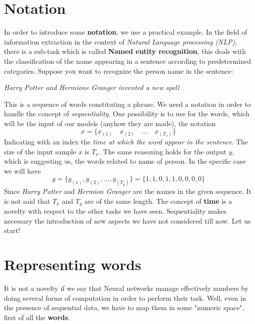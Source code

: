 \section{Notation}
In order to introduce some \textbf{notation}, we use a practical example. In the field of information extraction in the context of \textit{Natural Language processing (NLP)}, there is a sub-task which is called \textbf{Named entity recognition}, this deals with the classification of the name appearing in a sentence according to predetermined categories.
Suppose you want to recognize the person name in the sentence:
\begin{center}
    \textit{Harry Potter and Hermione Granger invented a new spell}
\end{center}
This is a sequence of words constituting a phrase. We need a notation in order to handle the concept of \textit{sequentiality}. One possibility is to use for the words, which will be the input of our models (anyhow they are made), the notation
\begin{equation*}
    x=\{x_{(1)}\quad x_{(2)} \quad ... \quad x_{(T_x)}\}
\end{equation*}  
Indicating with an index the \textit{time at which the word appear in the sentence}. The size of the input sample $x$ is $T_x$. The same reasoning holds for the output $y$, which is suggesting us, the words related to name of person. In the specific case we will have
\begin{equation*}
    y=\{y_{(1)}, y_{(2)}, \dots, y_{(T_y)}\} = \{1,1,0,1,1,0,0,0,0\}
\end{equation*}
Since \textit{Harry Potter} and \textit{Hermion Granger} are the names in the given sequence. It is not said that $T_x$ and $T_y$ are of the same length. The concept of \textbf{time} is a novelty with respect to the other tasks we have seen. Sequentiality makes necessary the introduction of new aspects we have not considered till now. Let us start!

\section{Representing words}
It is not a novelty if we say that Neural networks manage effectively numbers by doing several forms of computation in order to perform their task. Well, even in the presence of sequential data, we have to map them in some "numeric space", first of all the \textbf{words}. \\


